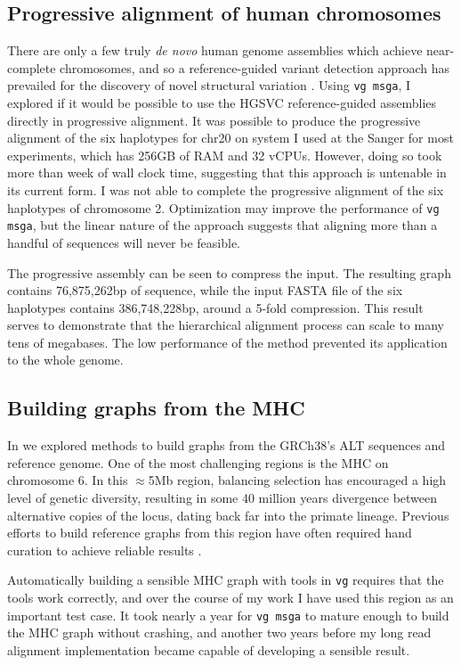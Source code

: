 \subsection{Progressive alignment of human chromosomes}

There are only a few truly \emph{de novo} human genome assemblies which achieve near-complete chromosomes, and so a reference-guided variant detection approach has prevailed for the discovery of novel structural variation \cite{fan2017hysa}.
Using {\tt vg msga}, I explored if it would be possible to use the HGSVC reference-guided assemblies directly in progressive alignment.
It was possible to produce the progressive alignment of the six haplotypes for chr20 on system I used at the Sanger for most experiments, which has 256GB of RAM and 32 vCPUs.
However, doing so took more than week of wall clock time, suggesting that this approach is untenable in its current form.
I was not able to complete the progressive alignment of the six haplotypes of chromosome 2.
Optimization may improve the performance of {\tt vg msga}, but the linear nature of the approach suggests that aligning more than a handful of sequences will never be feasible.

The progressive assembly can be seen to compress the input.
The resulting graph contains 76,875,262bp of sequence, while the input FASTA file of the six haplotypes contains 386,748,228bp, around a 5-fold compression.
This result serves to demonstrate that the hierarchical alignment process can scale to many tens of megabases.
The low performance of the method prevented its application to the whole genome.

\subsection{Building graphs from the MHC}

In \cite{novak2017genome} we explored methods to build graphs from the GRCh38's ALT sequences and reference genome.
One of the most challenging regions is the MHC on chromosome 6.
In this $\approx$5Mb region, balancing selection has encouraged a high level of genetic diversity, resulting in some 40 million years divergence between alternative copies of the locus, dating back far into the primate lineage.
Previous efforts to build reference graphs from this region have often required hand curation to achieve reliable results \cite{dilthey2015improved}.

Automatically building a sensible MHC graph with tools in {\tt vg} requires that the tools work correctly, and over the course of my work I have used this region as an important test case.
It took nearly a year for {\tt vg msga} to mature enough to build the MHC graph without crashing, and another two years before my long read alignment implementation became capable of developing a sensible result.

